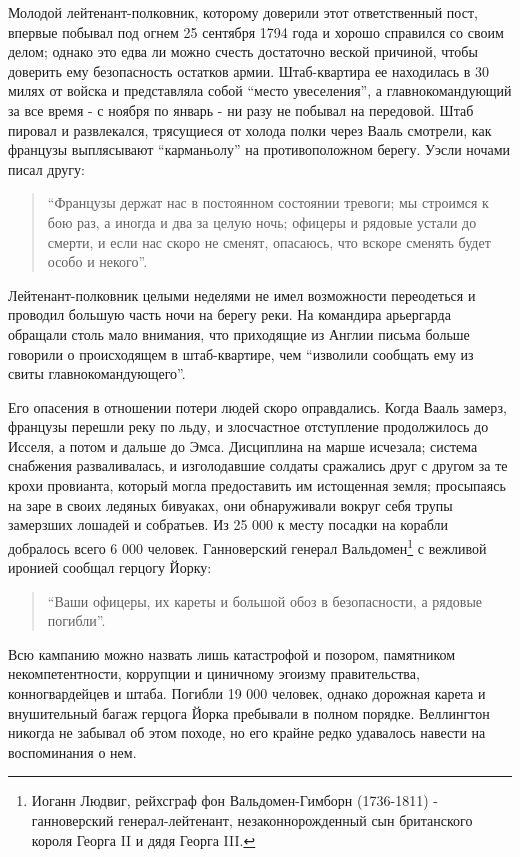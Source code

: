 \documentclass[
  oneside,
  12pt,
  titlepage]{book}
\begin{document}
Молодой лейтенант-полковник, которому доверили этот ответственный пост, впервые побывал под огнем 25 сентября 1794 года и хорошо справился со своим делом; однако это едва ли можно счесть достаточно веской причиной, чтобы доверить ему безопасность остатков армии. Штаб-квартира ее находилась в 30 милях от войска и представляла собой ``место увеселения'', а главнокомандующий за все время - с ноября по январь - ни разу не побывал на передовой. Штаб пировал и развлекался, трясущиеся от холода полки через Вааль смотрели, как французы выплясывают ``карманьолу'' на противоположном берегу. Уэсли ночами писал другу:

\begin{quote}
``Французы держат нас в постоянном состоянии тревоги; мы строимся к бою раз, а иногда и два за целую ночь; офицеры и рядовые устали до смерти, и если нас скоро не сменят, опасаюсь, что вскоре сменять будет особо и некого''.
\end{quote}

Лейтенант-полковник целыми неделями не имел возможности переодеться и проводил большую часть ночи на берегу реки. На командира арьергарда обращали столь мало внимания, что приходящие из Англии письма больше говорили о происходящем в штаб-квартире, чем ``изволили сообщать ему из свиты главнокомандующего''.

Его опасения в отношении потери людей скоро оправдались. Когда Вааль замерз, французы перешли реку по льду, и злосчастное отступление продолжилось до Исселя, а потом и дальше до Эмса. Дисциплина на марше исчезала; система снабжения разваливалась, и изголодавшие солдаты сражались друг с другом за те крохи провианта, который могла предоставить им истощенная земля; просыпаясь на заре в своих ледяных бивуаках, они обнаруживали вокруг себя трупы замерзших лошадей и собратьев. Из 25 000 к месту посадки на корабли добралось всего 6 000 человек. Ганноверский генерал Вальдомен\footnote{Иоганн Людвиг, рейхсграф фон Вальдомен-Гимборн (1736-1811) - ганноверский генерал-лейтенант, незаконнорожденный сын британского короля Георга II и дядя Георга III.} с вежливой иронией сообщал герцогу Йорку:

\begin{quote}
``Ваши офицеры, их кареты и большой обоз в безопасности, а рядовые погибли''.
\end{quote}

Всю кампанию можно назвать лишь катастрофой и позором, памятником некомпетентности, коррупции и циничному эгоизму правительства, конногвардейцев и штаба. Погибли 19 000 человек, однако дорожная карета и внушительный багаж герцога Йорка пребывали в полном порядке. Веллингтон никогда не забывал об этом походе, но его крайне редко удавалось навести на воспоминания о нем.
\end{document}
